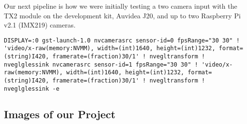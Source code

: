 \documentclass[letterpaper,10pt,serif,draftclsnofoot,onecolumn,compsoc,titlepage]{IEEEtran}
\begin{document}
Our next pipeline is how we were initially testing a two camera input with the TX2 module 
on the development kit, Auvidea J20, and up to two Raspberry Pi v2.1 (IMX219) cameras. \\

\begin{lstlisting}
DISPLAY=:0 gst-launch-1.0 nvcamerasrc sensor-id=0 fpsRange="30 30" ! 'video/x-raw(memory:NVMM), width=(int)1640, height=(int)1232, format=(string)I420, framerate=(fraction)30/1' ! nvegltransform ! nveglglessink nvcamerasrc sensor-id=1 fpsRange="30 30" ! 'video/x-raw(memory:NVMM), width=(int)1640, height=(int)1232, format=(string)I420, framerate=(fraction)30/1' ! nvegltransform ! nveglglessink -e
\end{lstlisting}
\cite{TwoCamPipe}

\subsection{Images of our Project}



\nocite{*}
\newpage


\end{document}
